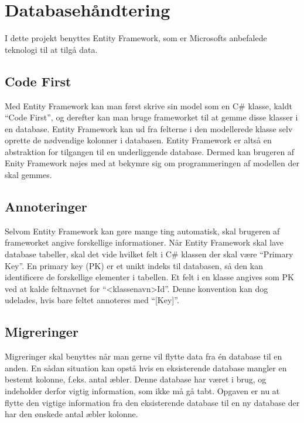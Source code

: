 \section{Databasehåndtering}
\label{sec:database}

I dette projekt benyttes Entity Framework, som er Microsofts anbefalede teknologi til at tilgå data.

\subsection{Code First}
\label{sub:code_first}


Med Entity Framework kan man først skrive sin model som en C\# klasse, kaldt \enquote{Code First}, og derefter kan man bruge frameworket til at gemme disse klasser i en database. Entity Framework kan ud fra felterne i den modellerede klasse selv oprette de nødvendige kolonner i databasen. Entity Framework er altså en abstraktion for tilgangen til en underliggende database. Dermed kan brugeren af Enity Framework nøjes med at bekymre sig om programmeringen af modellen der skal gemmes.

\subsection{Annoteringer}
\label{sub:annoteringer}

Selvom Entity Framework kan gøre mange ting automatisk, skal brugeren af frameworket angive forskellige informationer. Når Entity Framework skal lave database tabeller, skal det vide hvilket felt i C\# klassen der skal være \enquote{Primary Key}. En primary key (PK) er et unikt indeks til databasen, så den kan identificere de forskellige elementer i tabellen. Et felt i en klasse angives som PK ved at kalde feltnavnet for \enquote{<klassenavn>Id}. Denne konvention kan dog udelades, hvis bare feltet annoteres med \enquote{[Key]}.

\subsection{Migreringer}
\label{sub:migreringer}

Migreringer skal benyttes når man gerne vil flytte data fra én database til en anden. En sådan situation kan opstå hvis en eksisterende database mangler en bestemt kolonne, f.eks. antal æbler. Denne database har været i brug, og indeholder derfor vigtig information, som ikke må gå tabt. Opgaven er nu at flytte den vigtige information fra den eksisterende database til en ny database der har den ønskede antal æbler kolonne.


